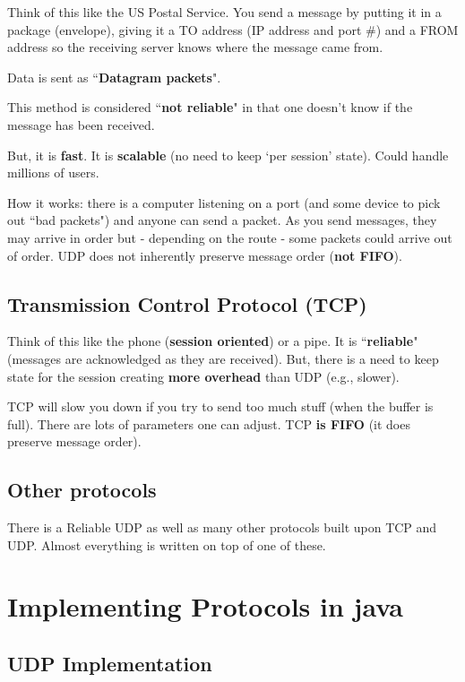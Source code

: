 \documentclass[twoside]{article}
\begin{document}
Think of this like the US Postal Service.  You send a message by putting it in a package (envelope), giving it a TO address (IP address and port #) and a FROM address so the receiving server knows where the message came from.

Data is sent as ``\textbf{Datagram packets}".

This method is considered ``\textbf{not reliable}" in that one doesn't know if the message has been received.

But, it is \textbf{fast}.  It is \textbf{scalable} (no need to keep `per session' state).  Could handle millions of users.

How it works: there is a computer listening on a port (and some device to pick out ``bad packets") and anyone can send a packet.  As you send messages, they may arrive in order but - depending on the route - some packets could arrive out of order.  UDP does not inherently preserve message order (\textbf{not FIFO}).


\subsection{Transmission Control Protocol (TCP)}

Think of this like the phone (\textbf{session oriented}) or a pipe.  It is ``\textbf{reliable}" (messages are acknowledged as they are received).  But, there is a need to keep state for the session creating \textbf{more overhead} than UDP (e.g., slower).

TCP will slow you down if you try to send too much stuff (when the buffer is full).  There are lots of parameters one can adjust.  TCP \textbf{is FIFO} (it does preserve message order).

\subsection{Other protocols}

There is a Reliable UDP as well as many other protocols built upon TCP and UDP.  Almost everything is written on top of one of these.


\section{Implementing Protocols in java}

\subsection{UDP Implementation}
\end{document}

